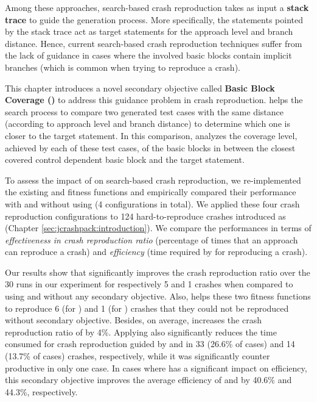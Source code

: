 
Among these approaches, search-based crash reproduction \cite{Rossler2013, Soltani2018a} takes as input a \textbf{stack trace} to guide the generation process. More specifically, the statements pointed by the stack trace act as target statements for the approach level and branch distance.
Hence, current search-based crash reproduction techniques suffer from the lack of guidance in cases where the involved basic blocks contain implicit branches (which is common when trying to reproduce a crash). 

This chapter introduces a novel secondary objective called \textbf{Basic Block Coverage (\bbc)} to address this guidance problem in crash reproduction. \bbc helps the search process to compare two generated test cases with the same distance (according to approach level and branch distance) to determine which one is closer to the target statement. In this comparison, \bbc
analyzes the coverage level, achieved by each of these test cases, of the basic blocks in between the closest covered control dependent basic block and the target statement.

To assess the impact of \bbc on search-based crash reproduction, we re-implemented the existing \integ \cite{Rossler2013} and \WS \cite{Soltani2018a} fitness functions and empirically compared their  performance with and without using \bbc (4 configurations in total). 
We applied these four crash reproduction configurations to 124 hard-to-reproduce crashes introduced as \crashpack (Chapter \ref{sec:jcrashpack:introduction}).
We compare the performances in terms of \textit{effectiveness in crash reproduction ratio} (\ie percentage of times that an approach can reproduce a crash) and \textit{efficiency} (\ie time required by for reproducing a crash).

Our results show that \bbc significantly improves the crash reproduction ratio over the 30 runs in our experiment for respectively 5 and 1 crashes when compared to using \integ and \WS without any secondary objective. Also, \bbc helps these two fitness functions to reproduce 6 (for \integ) and 1 (for \WS) crashes that they could not be reproduced without secondary objective. 
Besides, on average, \bbc increases the crash reproduction ratio of \integ by 4\%. 
Applying \bbc also significantly reduces the time consumed for crash reproduction guided by \integ and \WS in 33 (26.6\% of cases) and 14 (13.7\% of cases) crashes, respectively, while it was significantly counter productive in only one case. In cases where \bbc has a significant impact on efficiency, this secondary objective improves the average efficiency of \integ and \WS by 40.6\% and 44.3\%, respectively.
